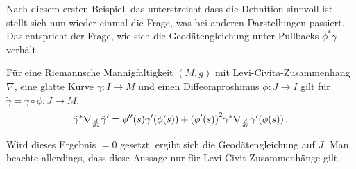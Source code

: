\iffalse
\begin{figure}
\centering

\texttt{[image: Bilder/vectorfield\_example\_circle.pdf]}

\caption{Tangentialvektorfeld am Kreisbogen}
\label{fig:keine_geodaete}
\end{figure}
\fi


Nach diesem ersten Beispiel, das unterstreicht dass die Definition sinnvoll ist, stellt sich nun wieder einmal die Frage, was bei anderen Darstellungen passiert. Das entspricht der Frage, wie sich die Geodätengleichung unter Pullbacks $\phi^* \gamma$ verhält.

\begin{lemma}
Für eine Riemannsche Mannigfaltigkeit $(M, g)$ mit Levi-Civita-Zusammenhang $\nabla$, eine glatte Kurve $\gamma: I \rightarrow M$ und einen Diffeomproshimus $\phi: J \rightarrow I$ gilt für $\tilde{\gamma} = \gamma \circ \phi: J \rightarrow M$:
\begin{equation}
\tilde{\gamma}^* \nabla_{\dv{s}} \tilde{\gamma}' = \phi''(s) \gamma'\qty(\phi(s)) + \qty(\phi'(s))^2 \gamma^* \nabla_{\dv{t}} \gamma'\qty(\phi(s)) \, .
\end{equation}
\end{lemma}
Wird dieses Ergebnis $= 0$ gesetzt, ergibt sich die Geodätengleichung auf $J$. Man beachte allerdings, dass diese Aussage nur für Levi-Civit-Zusammenhänge gilt.\\



